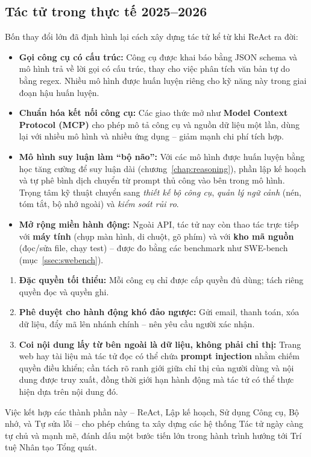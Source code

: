 \subsection{Tác tử trong thực tế 2025--2026 \newtag}
\label{ssec:modern_agents}
Bốn thay đổi lớn đã định hình lại cách xây dựng tác tử kể từ khi ReAct ra đời:
\begin{itemize}
	\item \textbf{Gọi công cụ có cấu trúc:} Công cụ được khai báo bằng JSON schema và mô hình trả về lời gọi có cấu trúc, thay cho việc phân tích văn bản tự do bằng regex. Nhiều mô hình được huấn luyện riêng cho kỹ năng này trong giai đoạn hậu huấn luyện.
	\item \textbf{Chuẩn hóa kết nối công cụ:} Các giao thức mở như \textbf{Model Context Protocol (MCP)} cho phép mô tả công cụ và nguồn dữ liệu một lần, dùng lại với nhiều mô hình và nhiều ứng dụng -- giảm mạnh chi phí tích hợp.
	\item \textbf{Mô hình suy luận làm “bộ não”:} Với các mô hình được huấn luyện bằng học tăng cường để suy luận dài (chương~\ref{chap:reasoning}), phần lập kế hoạch và tự phê bình dịch chuyển từ prompt thủ công vào bên trong mô hình. Trọng tâm kỹ thuật chuyển sang \emph{thiết kế bộ công cụ}, \emph{quản lý ngữ cảnh} (nén, tóm tắt, bộ nhớ ngoài) và \emph{kiểm soát rủi ro}.
	\item \textbf{Mở rộng miền hành động:} Ngoài API, tác tử nay còn thao tác trực tiếp với \textbf{máy tính} (chụp màn hình, di chuột, gõ phím) và với \textbf{kho mã nguồn} (đọc/sửa file, chạy test) -- được đo bằng các benchmark như SWE-bench (mục~\ref{ssec:swebench}).
\end{itemize}
\begin{tcolorbox}[title={An toàn cho tác tử: ba nguyên tắc tối thiểu}, colback=red!5!white, colframe=red!75!black, fonttitle=\bfseries]
\begin{enumerate}
	\item \textbf{Đặc quyền tối thiểu:} Mỗi công cụ chỉ được cấp quyền đủ dùng; tách riêng quyền đọc và quyền ghi.
	\item \textbf{Phê duyệt cho hành động khó đảo ngược:} Gửi email, thanh toán, xóa dữ liệu, đẩy mã lên nhánh chính -- nên yêu cầu người xác nhận.
	\item \textbf{Coi nội dung lấy từ bên ngoài là dữ liệu, không phải chỉ thị:} Trang web hay tài liệu mà tác tử đọc có thể chứa \textbf{prompt injection} nhằm chiếm quyền điều khiển; cần tách rõ ranh giới giữa chỉ thị của người dùng và nội dung được truy xuất, đồng thời giới hạn hành động mà tác tử có thể thực hiện dựa trên nội dung đó.
\end{enumerate}
\end{tcolorbox}

Việc kết hợp các thành phần này -- ReAct, Lập kế hoạch, Sử dụng Công cụ, Bộ nhớ, và Tự sửa lỗi -- cho phép chúng ta xây dựng các hệ thống Tác tử ngày càng tự chủ và mạnh mẽ, đánh dấu một bước tiến lớn trong hành trình hướng tới Trí tuệ Nhân tạo Tổng quát.
